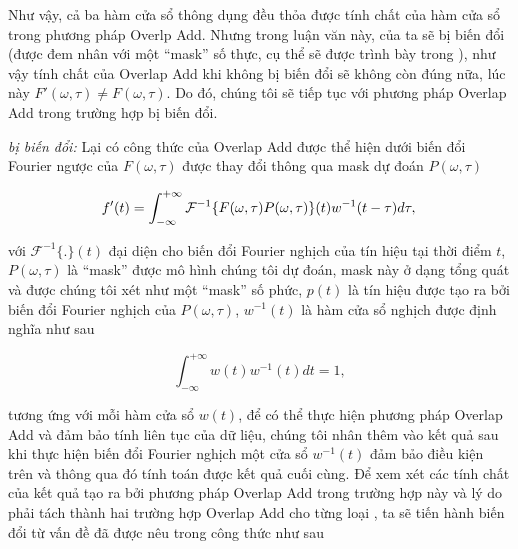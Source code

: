 		Như vậy, cả ba hàm cửa sổ thông dụng đều thỏa được tính chất của hàm cửa sổ trong phương pháp Overlp Add. Nhưng trong luận văn này, \spectrogram{} của ta sẽ bị biến đổi (được đem nhân với một ``mask'' số thực, cụ thể sẽ được trình bày trong ), như vậy tính chất của Overlap Add khi \spectrogram{} không bị biến đổi sẽ không còn đúng nữa, lúc này $F'(\omega, \tau) \neq F(\omega, \tau)$. Do đó, chúng tôi sẽ tiếp tục với phương pháp Overlap Add trong trường hợp \spectrogram{} bị biến đổi.
		
		\textit{\Spectrogram{} bị biến đổi:} Lại có công thức của Overlap Add được thể hiện dưới biến đổi Fourier ngược của \spectrogram{} $F(\omega, \tau)$ được thay đổi thông qua mask dự đoán $P(\omega, \tau)$
		
			\begin{equation}
				f'(t) = \int_{-\infty}^{+\infty} \mathcal{F}^{-1}\{F(\omega, \tau) P(\omega, \tau)\}(t) w^{-1}(t - \tau) d\tau, \\
				\label{ola::modified_spectrogram_prob}
			\end{equation}
		
		\noindent với $\mathcal{F}^{-1}\{.\}(t)$ đại diện cho biến đổi Fourier nghịch của tín hiệu tại thời điểm $t$, $P(\omega, \tau)$ là ``mask'' được mô hình chúng tôi dự đoán, mask này ở dạng tổng quát và được chúng tôi xét như một ``mask'' số phức, $p(t)$ là tín hiệu được tạo ra bởi biến đổi Fourier nghịch của $P(\omega, \tau)$, $w^{-1}(t)$ là hàm cửa sổ nghịch được định nghĩa như sau
		
			\begin{equation}
				\int_{-\infty}^{+\infty} w(t) w^{-1}(t) dt = 1,
			\end{equation}
		
		\noindent tương ứng với mỗi hàm cửa sổ $w(t)$, để có thể thực hiện phương pháp Overlap Add và đảm bảo tính liên tục của dữ liệu, chúng tôi nhân thêm vào kết quả sau khi thực hiện biến đổi Fourier nghịch một cửa sổ $w^{-1}(t)$ đảm bảo điều kiện trên và thông qua đó tính toán được kết quả cuối cùng. Để xem xét các tính chất của kết quả tạo ra bởi phương pháp Overlap Add trong trường hợp này và lý do phải tách thành hai trường hợp Overlap Add cho từng loại \spectrogram{}, ta sẽ tiến hành biến đổi từ vấn đề đã được nêu trong công thức  như sau
		
